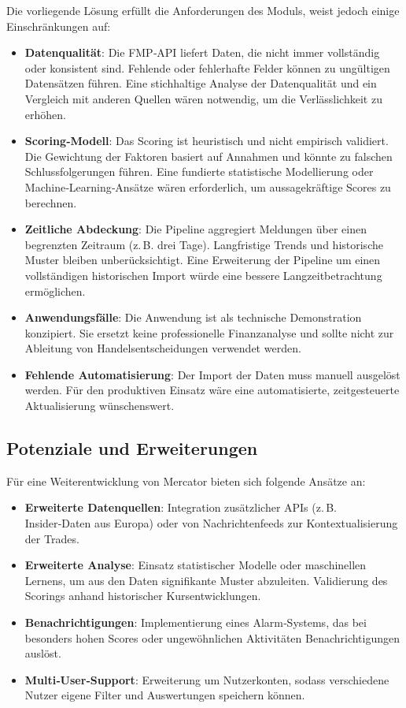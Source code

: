 Die vorliegende Lösung erfüllt die Anforderungen des Moduls, weist jedoch einige Einschränkungen auf:

\begin{itemize}[leftmargin=1.2cm]
  \item \textbf{Datenqualität}: Die FMP‑API liefert Daten, die nicht immer vollständig oder konsistent sind. Fehlende oder fehlerhafte Felder können zu ungültigen Datensätzen führen. Eine stichhaltige Analyse der Datenqualität und ein Vergleich mit anderen Quellen wären notwendig, um die Verlässlichkeit zu erhöhen.
  \item \textbf{Scoring‑Modell}: Das Scoring ist heuristisch und nicht empirisch validiert. Die Gewichtung der Faktoren basiert auf Annahmen und könnte zu falschen Schlussfolgerungen führen. Eine fundierte statistische Modellierung oder Machine‑Learning‑Ansätze wären erforderlich, um aussagekräftige Scores zu berechnen.
  \item \textbf{Zeitliche Abdeckung}: Die Pipeline aggregiert Meldungen über einen begrenzten Zeitraum (z.\,B. drei Tage). Langfristige Trends und historische Muster bleiben unberücksichtigt. Eine Erweiterung der Pipeline um einen vollständigen historischen Import würde eine bessere Langzeitbetrachtung ermöglichen.
  \item \textbf{Anwendungsfälle}: Die Anwendung ist als technische Demonstration konzipiert. Sie ersetzt keine professionelle Finanzanalyse und sollte nicht zur Ableitung von Handelsentscheidungen verwendet werden.
  \item \textbf{Fehlende Automatisierung}: Der Import der Daten muss manuell ausgelöst werden. Für den produktiven Einsatz wäre eine automatisierte, zeitgesteuerte Aktualisierung wünschenswert.
\end{itemize}

\subsection{Potenziale und Erweiterungen}

Für eine Weiterentwicklung von Mercator bieten sich folgende Ansätze an:

\begin{itemize}[leftmargin=1.2cm]
  \item \textbf{Erweiterte Datenquellen}: Integration zusätzlicher APIs (z.\,B. Insider‑Daten aus Europa) oder von Nachrichtenfeeds zur Kontextualisierung der Trades.
  \item \textbf{Erweiterte Analyse}: Einsatz statistischer Modelle oder maschinellen Lernens, um aus den Daten signifikante Muster abzuleiten. Validierung des Scorings anhand historischer Kursentwicklungen.
  \item \textbf{Benachrichtigungen}: Implementierung eines Alarm‑Systems, das bei besonders hohen Scores oder ungewöhnlichen Aktivitäten Benachrichtigungen auslöst.
  \item \textbf{Multi‑User‑Support}: Erweiterung um Nutzerkonten, sodass verschiedene Nutzer eigene Filter und Auswertungen speichern können.
\end{itemize}